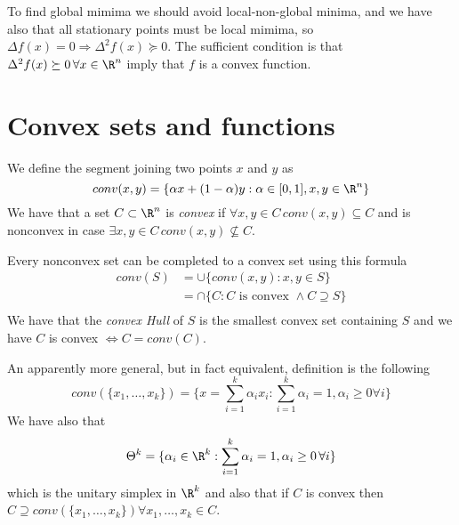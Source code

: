 To find global mimima we should avoid local-non-global minima, and we have also that all stationary
points must be local mimima, so $\Delta f(x) = 0 \Rightarrow \Delta^2 f(x) \succeq 0$.\newline
The sufficient condition is that $\Delta^2 f(x) \succeq 0 \, \forall x \in \R^n$ imply 
that $f$ is a convex function.

\section{Convex sets and functions}
We define the segment joining two points $x$ and $y$ as 
\[ conv(x, y) = \{\alpha x + (1 - \alpha) y: \alpha \in [0, 1], x, y \in \R^n\} \]
We have that a set $C \subset \R^n$ is \emph{convex} if $\forall x, y \in C \, conv(x, y) \subseteq C$
and is nonconvex in case $\exists x, y \in C \, conv(x, y) \not \subseteq C$.

Every nonconvex set can be completed to a convex set using this formula
\begin{align*}
	conv(S) & = \cup \{conv(x, y): x, y \in S\} \\
	        & = \cap \{C: C \text{ is convex } \land C \supseteq S \} \\
\end{align*}
We have that the \emph{convex Hull} of $S$ is the smallest convex set containing $S$ and we have 
$C$ is convex $\iff C = conv(C)$.

An apparently more general, but in fact equivalent, definition is the following 
\[ conv(\{x_1, \dots, x_k\}) = \{x = \sum_{i=1}^k \alpha_i x_i: \sum_{i=1}^k \alpha_i = 1, 
                                                         \alpha_i \geq 0 \forall i \} \]
We have also that 
\[ \Theta^k = \{\alpha_i \in \R^k: \sum_{i=1}^k \alpha_i = 1, \alpha_i \geq 0 \, \forall i\} \]
which is the unitary simplex in $\R^k$ and also that if $C$ is convex then 
$C \supseteq conv(\{x_1, \dots, x_k\}) \forall x_1, \dots, x_k \in C$.


